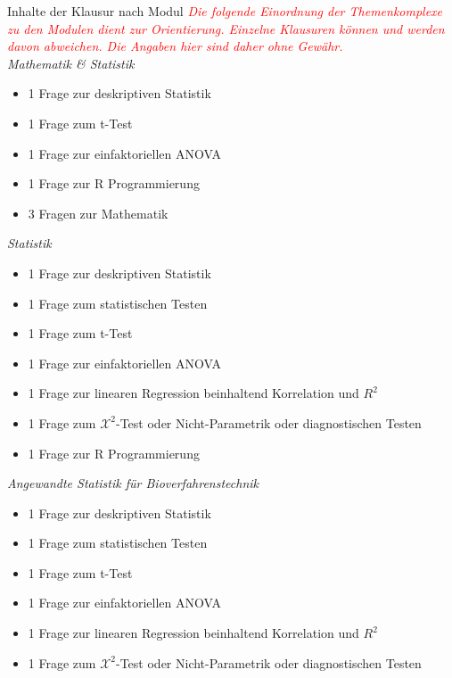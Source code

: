 \documentclass[a4paper, 10pt]{scrartcl}\usepackage[]{graphicx}\usepackage[]{xcolor}
\begin{document}
\maketitle
\thispagestyle{empty}
\clearpage

\begin{graybox}{Inhalte der Klausur nach Modul}  
  \small
  \textcolor{red}{\textit{Die folgende Einordnung der Themenkomplexe zu den Modulen dient zur Orientierung. Einzelne Klausuren können und werden davon abweichen. Die Angaben hier sind daher ohne Gewähr.}}\\[1Ex]
  \textit{Mathematik \& Statistik} 
  \begin{itemize}
  \item 1 Frage zur deskriptiven Statistik
  \item 1 Frage zum t-Test
  \item 1 Frage zur einfaktoriellen ANOVA
  \item 1 Frage zur R Programmierung
  \item 3 Fragen zur Mathematik
  \end{itemize} 
  \textit{Statistik} 
  \begin{itemize}
  \item 1 Frage zur deskriptiven Statistik
  \item 1 Frage zum statistischen Testen
  \item 1 Frage zum t-Test
  \item 1 Frage zur einfaktoriellen ANOVA
  \item 1 Frage zur linearen Regression beinhaltend Korrelation und $R^2$
  \item 1 Frage zum $\mathcal{X}^2$-Test oder Nicht-Parametrik oder diagnostischen Testen
  \item 1 Frage zur R Programmierung
  \end{itemize} 
  \textit{Angewandte Statistik für Bioverfahrenstechnik } 
  \begin{itemize}
  \item 1 Frage zur deskriptiven Statistik
  \item 1 Frage zum statistischen Testen
  \item 1 Frage zum t-Test
  \item 1 Frage zur einfaktoriellen ANOVA
  \item 1 Frage zur linearen Regression beinhaltend Korrelation und $R^2$
  \item 1 Frage zum $\mathcal{X}^2$-Test oder Nicht-Parametrik oder diagnostischen Testen

\end{itemize}
\end{graybox}
\end{document}
